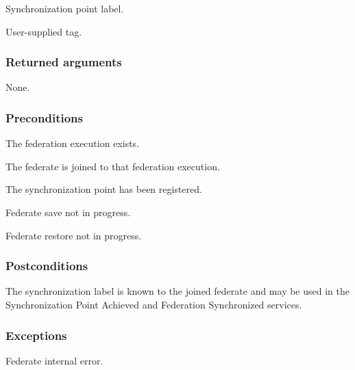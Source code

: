 \begin{stdalphalist}
    \item Synchronization point label.
    \item User-supplied tag.
\end{stdalphalist}

\subsubsection{Returned arguments}

\begin{stdalphalist}
    \item None.
\end{stdalphalist}

\subsubsection{Preconditions}

\begin{stdalphalist}
    \item The federation execution exists.
    \item The federate is joined to that federation execution.
    \item The synchronization point has been registered.
    \item Federate save not in progress.
    \item Federate restore not in progress.
\end{stdalphalist}

\subsubsection{Postconditions}

\begin{stdalphalist}
    \item The synchronization label is known to the joined federate and may be used in the Synchronization Point Achieved and Federation Synchronized \rtiinitiated{} services.
\end{stdalphalist}

\subsubsection{Exceptions}

\begin{stdalphalist}
    \item Federate internal error.
\end{stdalphalist}

